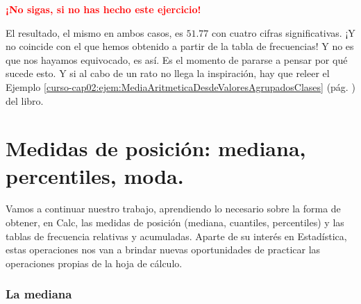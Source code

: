 \documentclass[10pt,a4paper]{article}\usepackage[]{graphicx}\usepackage[]{color}
\newcounter {cont01}
\begin{document}
\begin{center}
  \textcolor{red}{\LARGE\bf  ¡No sigas, si no has hecho este ejercicio!}
\end{center}

\newpage

El resultado, el mismo en ambos casos, es $51.77$ con cuatro cifras significativas. ¡Y no coincide con el que hemos obtenido a partir de la tabla de frecuencias! Y no es que nos hayamos equivocado, es así. Es el momento de pararse a pensar por qué sucede esto. Y si al cabo de un rato no llega la inspiración, hay que releer el Ejemplo \ref{curso-cap02:ejem:MediaAritmeticaDesdeValoresAgrupadosClases} (pág. \pageref{curso-cap02:ejem:MediaAritmeticaDesdeValoresAgrupadosClases}) del libro.


\section{Medidas de posición: mediana, percentiles, moda.}
\label{tut01:sec:MedidasPosicion}

Vamos a continuar nuestro trabajo, aprendiendo lo necesario sobre la forma de obtener, en Calc, las medidas de posición (mediana, cuantiles, percentiles) y las tablas de frecuencia relativas y acumuladas. Aparte de su interés en Estadística, estas operaciones nos van a brindar nuevas oportunidades de practicar las operaciones propias de la hoja de cálculo.

\subsubsection*{La mediana}
\label{tut01:subsubsec:Mediana}
\end{document}
